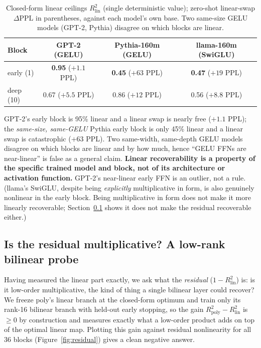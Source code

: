 \documentclass{article}
\newcommand{\Rlin}{R^2_{\mathrm{lin}}}
\newcommand{\Rpoly}{R^2_{\mathrm{poly}}}
\newcommand{\dppl}{\Delta\mathrm{PPL}}
\begin{document}
\begin{table}[t]
  \centering
  \caption{Closed-form linear ceilings $\Rlin$ (single deterministic value); zero-shot
  linear-swap $\dppl$ in parentheses, against each model's own base. Two same-size GELU models
  (GPT-2, Pythia) disagree on which blocks are linear.}
  \label{tab:learned}
  \begin{tabular}{lccc}
    \toprule
    Block & GPT-2 (GELU) & Pythia-160m (GELU) & llama-160m (SwiGLU) \\
    \midrule
    early (1) & \textbf{0.95} ($+1.1$ PPL) & \textbf{0.45} ($+63$ PPL) & \textbf{0.47} ($+19$ PPL) \\
    deep (10) & 0.67 ($+5.5$ PPL) & 0.86 ($+12$ PPL) & 0.56 ($+8.8$ PPL) \\
    \bottomrule
  \end{tabular}
\end{table}

GPT-2's early block is 95\% linear and a linear swap is nearly free ($+1.1$ PPL); the
\emph{same-size, same-GELU} Pythia early block is only 45\% linear and a linear swap is
catastrophic ($+63$ PPL). Two same-width, same-depth GELU models disagree on which blocks
are linear and by how much, hence ``GELU FFNs are near-linear'' is false as a general claim.
\textbf{Linear recoverability is a property of the specific trained model and block, not of
its architecture or activation function.} GPT-2's
near-linear early FFN is an outlier, not a rule.
(llama's SwiGLU, despite being \emph{explicitly} multiplicative in form, is also genuinely
nonlinear in the early block. Being multiplicative in form does not make it more linearly
recoverable; Section~\ref{sec:residual} shows it does not make the residual recoverable
either.)

\subsection{Is the residual multiplicative? A low-rank bilinear probe}
\label{sec:residual}

Having measured the linear part exactly, we ask what the \emph{residual} ($1-\Rlin$) is: is it
low-order multiplicative, the kind of thing a single bilinear layer could recover? We freeze
poly's linear branch at the closed-form optimum and train only its rank-16 bilinear branch
with held-out early stopping, so the gain $\Rpoly - \Rlin$ is $\ge 0$ by construction and
measures exactly what a low-order product adds on top of the optimal linear map. Plotting this
gain against residual nonlinearity for all 36 blocks (Figure~\ref{fig:residual}) gives a clean
negative answer.
\end{document}
